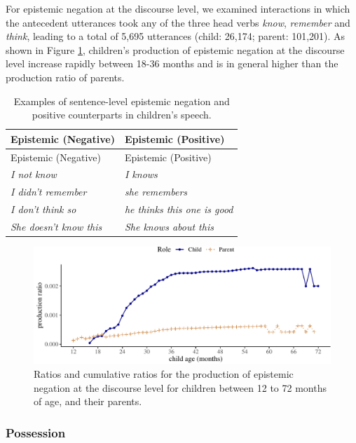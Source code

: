 \documentclass[
  english,
  man,floatsintext]{apa6}
\begin{document}
For epistemic negation at the discourse level, we examined interactions in which the antecedent utterances took any of the three head verbs \emph{know}, \emph{remember} and \emph{think}, leading to a total of 5,695 utterances (child: 26,174; parent: 101,201). As shown in Figure \ref{fig:epistemicdiscourse}, children's production of epistemic negation at the discourse level increase rapidly between 18-36 months and is in general higher than the production ratio of parents.

\begin{longtable}[]{@{}ll@{}}
\caption{\label{tab:epistem} Examples of sentence-level epistemic negation and positive counterparts in children's speech.}\tabularnewline
\toprule
Epistemic (Negative) & Epistemic (Positive) \\
\midrule
\endfirsthead
\toprule
Epistemic (Negative) & Epistemic (Positive) \\
\midrule
\endhead
\emph{I not know} & \emph{I knows} \\
\emph{I didn't remember} & \emph{she remembers} \\
\emph{I don't think so} & \emph{he thinks this one is good} \\
\emph{She doesn't know this} & \emph{She knows about this} \\
\bottomrule
\end{longtable}

\begin{figure}[H]

{\centering \includegraphics{neg_construction_article_files/figure-latex/epistemicdiscourse-1} 

}

\caption{Ratios and cumulative ratios for the production of epistemic negation at the discourse level for children between 12 to 72 months of age, and their parents.}\label{fig:epistemicdiscourse}
\end{figure}

\hypertarget{possession}{%
\subsubsection{Possession}\label{possession}}
\end{document}
